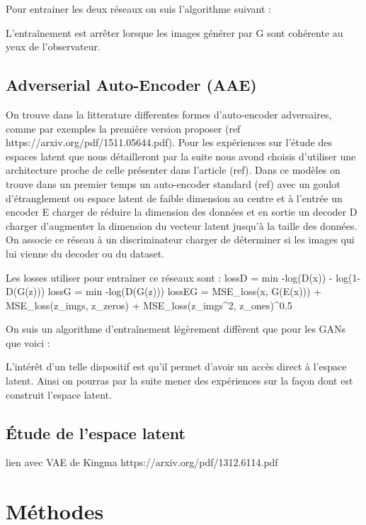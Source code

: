 \documentclass[11pt]{article}
\begin{document}
Pour entrainer les deux réseaux on suis l'algorithme suivant :

L'entraînement est arrêter lorsque les images générer par G sont cohérente au yeux de l'observateur.

\subsection{Adverserial Auto-Encoder (AAE)}
On trouve dans la litterature differentes formes d'auto-encoder adversaires, comme par exemples la première version proposer (ref https://arxiv.org/pdf/1511.05644.pdf).
Pour les expériences sur l'étude des espaces latent que nous détailleront par la suite nous avond choisis d'utiliser une architecture proche de celle présenter dans l'article (ref).
Dans ce modèles on trouve dans un premier temps un auto-encoder standard (ref) avec un goulot d'étranglement ou espace latent de faible dimension au centre et à l'entrée un encoder E charger de réduire la dimension des données et en sortie un decoder D charger d'augmenter la dimension du vecteur latent jusqu'à la taille des données. On associe ce réseau à un discriminateur charger de déterminer si les images qui lui vienne du decoder ou du dataset.

Les losses utiliser pour entraîner ce réseaux sont :
lossD = min -log(D(x)) - log(1-D(G(z)))
lossG = min -log(D(G(z)))
lossEG = MSE_loss(x, G(E(x))) + MSE_loss(z_imgs, z_zeros) + MSE_loss(z_imgs^2, z_ones)^0.5

On suis un algorithme d'entraînement légèrement diffèrent que pour les GANs que voici :

L'intérêt d'un telle dispositif est qu'il permet d'avoir un accès direct à l'espace latent. Ainsi on pourras par la suite mener des expériences sur la façon dont est construit l'espace latent.


\subsection{Étude de l'espace latent}
lien avec VAE de Kingma https://arxiv.org/pdf/1312.6114.pdf

\section{Méthodes}
\end{document}
